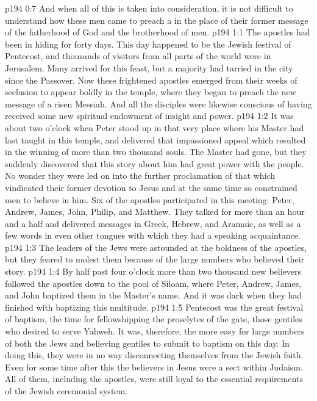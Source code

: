 \vs p194 0:7 And when all of this is taken into consideration, it is not difficult to understand how these men came to preach a  in the place of their former message of the fatherhood of God and the brotherhood of men.
\vs p194 1:1 The apostles had been in hiding for forty days. This day happened to be the Jewish festival of Pentecost, and thousands of visitors from all parts of the world were in Jerusalem. Many arrived for this feast, but a majority had tarried in the city since the Passover. Now these frightened apostles emerged from their weeks of seclusion to appear boldly in the temple, where they began to preach the new message of a risen Messiah. And all the disciples were likewise conscious of having received some new spiritual endowment of insight and power.
\vs p194 1:2 It was about two o’clock when Peter stood up in that very place where his Master had last taught in this temple, and delivered that impassioned appeal which resulted in the winning of more than two thousand souls. The Master had gone, but they suddenly discovered that this story about him had great power with the people. No wonder they were led on into the further proclamation of that which vindicated their former devotion to Jesus and at the same time so constrained men to believe in him. Six of the apostles participated in this meeting: Peter, Andrew, James, John, Philip, and Matthew. They talked for more than an hour and a half and delivered messages in Greek, Hebrew, and Aramaic, as well as a few words in even other tongues with which they had a speaking acquaintance.
\vs p194 1:3 The leaders of the Jews were astounded at the boldness of the apostles, but they feared to molest them because of the large numbers who believed their story.
\vs p194 1:4 By half past four o’clock more than two thousand new believers followed the apostles down to the pool of Siloam, where Peter, Andrew, James, and John baptized them in the Master’s name. And it was dark when they had finished with baptizing this multitude.
\vs p194 1:5 Pentecost was the great festival of baptism, the time for fellowshipping the proselytes of the gate, those gentiles who desired to serve Yahweh. It was, therefore, the more easy for large numbers of both the Jews and believing gentiles to submit to baptism on this day. In doing this, they were in no way disconnecting themselves from the Jewish faith. Even for some time after this the believers in Jesus were a sect within Judaism. All of them, including the apostles, were still loyal to the essential requirements of the Jewish ceremonial system.
